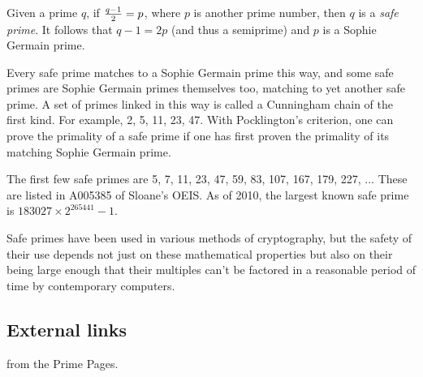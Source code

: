 \documentclass[12pt]{article}
\begin{document}
Given a prime $q$, if ${{q - 1} \over 2} = p$, where $p$ is another prime number, then $q$ is a {\em safe prime}. It follows that $q - 1 = 2p$ (and thus a semiprime) and $p$ is a Sophie Germain prime.

Every safe prime matches to a Sophie Germain prime this way, and some safe primes are Sophie Germain primes themselves too, matching to yet another safe prime. A set of primes linked in this way is called a Cunningham chain of the first kind. For example, 2, 5, 11, 23, 47. With Pocklington's criterion, one can prove the primality of a safe prime if one has first proven the primality of its matching Sophie Germain prime.

The first few safe primes are 5, 7, 11, 23, 47, 59, 83, 107, 167, 179, 227, ... These are listed in A005385 of Sloane's OEIS. As of 2010, the largest known safe prime is $183027 \times 2^{265441} - 1$.

Safe primes have been used in various methods of cryptography, but the safety of their use depends not just on these mathematical properties but also on their being large enough that their multiples can't be factored in a reasonable period of time by contemporary computers.

\subsection{External links}

 from the Prime Pages.
\end{document}

